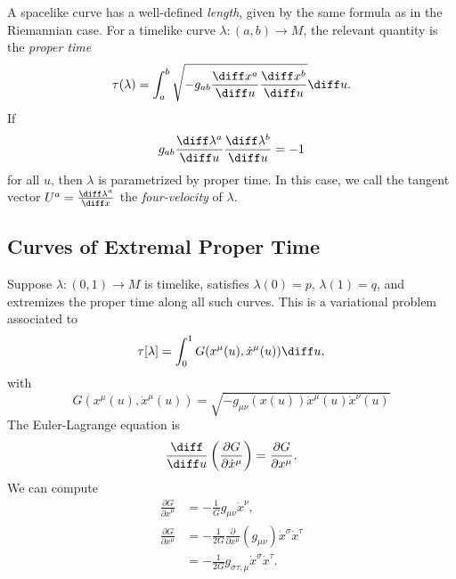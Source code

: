 \documentclass[12pt]{article}
\begin{document}
A spacelike curve has a well-defined \emph{length}, given by the same formula as in the Riemannian case. For a timelike curve $\lambda : (a, b) \to M$, the relevant quantity is the \emph{proper time}
\[
	\tau(\lambda) = \int_{a}^b \sqrt{-g_{ab} \frac{\diff x^a}{\diff u} \frac{\diff x^b}{\diff u}} \diff u.
\]
If
\[
g_{ab} \frac{\diff \lambda^a}{\diff u} \frac{\diff \lambda^b}{\diff u} = -1
\]
for all $u$, then $\lambda$ is parametrized by proper time. In this case, we call the tangent vector $U^a = \frac{\diff \lambda^a}{\diff x}$ the \emph{four-velocity} of $\lambda$.

\subsection{Curves of Extremal Proper Time}%
\label{sub:cept}

Suppose $\lambda : (0, 1) \to M$ is timelike, satisfies $\lambda(0) = p$, $\lambda(1) = q$, and extremizes the proper time along all such curves. This is a variational problem associated to
\[
	\tau[\lambda] = \int_0^1 G(x^\mu(u), \dot x^\mu(u)) \diff u,
\]
with
\[
	G(x^\mu(u), \dot x^\mu(u)) = \sqrt{-g_{\mu\nu}(x(u)) \dot x^\mu(u) \dot x^\nu(u)}
\]
The Euler-Lagrange equation is
\[
\frac{\diff}{\diff u} \left( \frac{\partial G}{\partial \dot x^\mu} \right) = \frac{\partial G}{\partial x^\mu}.
\]
We can compute
\begin{align*}
	\frac{\partial G}{\partial \dot x^\mu} &= - \frac{1}{G} g_{\mu\nu} \dot x^\nu, \\
	\frac{\partial G}{\partial x^\mu} &= - \frac{1}{2G} \frac{\partial}{\partial x^\mu} (g_{\mu\nu}) \dot x^\sigma \dot x^\tau \\
					  &= - \frac{1}{2G} g_{\sigma\tau,\mu} \dot x^\sigma \dot x^\tau.
\end{align*}


\newpage

\printindex
\end{document}
